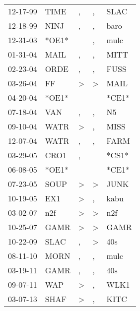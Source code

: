 \begin{supertabular}{lllll}
 12-17-99 &   TIME &             , &             , &   SLAC \\
 12-18-99 &   NINJ &             , &             , &   baro \\
 12-31-03 &  *OE1* &               &             , &   mulc \\
 01-31-04 &   MAIL &             , &             , &   MITT \\
 02-23-04 &   ORDE &             , &             , &   FUSS \\
 03-26-04 &     FF &  \textgreater &  \textgreater &   MAIL \\
 04-20-04 &  *OE1* &               &               &  *CE1* \\
 07-18-04 &    VAN &             , &             , &     N5 \\
 09-10-04 &   WATR &  \textgreater &             , &   MISS \\
 12-07-04 &   WATR &             , &             , &   FARM \\
 03-29-05 &   CRO1 &             , &               &  *CS1* \\
 06-08-05 &  *OE1* &               &               &  *CE1* \\
 07-23-05 &   SOUP &  \textgreater &  \textgreater &   JUNK \\
 10-19-05 &    EX1 &  \textgreater &             , &   kabu \\
 03-02-07 &    n2f &  \textgreater &  \textgreater &    n2f \\
 10-25-07 &   GAMR &  \textgreater &  \textgreater &   GAMR \\
 10-22-09 &   SLAC &             , &  \textgreater &    40s \\
 08-11-10 &   MORN &             , &             , &   mulc \\
 03-19-11 &   GAMR &             , &             , &    40s \\
 09-07-11 &    WAP &  \textgreater &             , &   WLK1 \\
 03-07-13 &   SHAF &  \textgreater &             , &   KITC \\
\end{supertabular}
